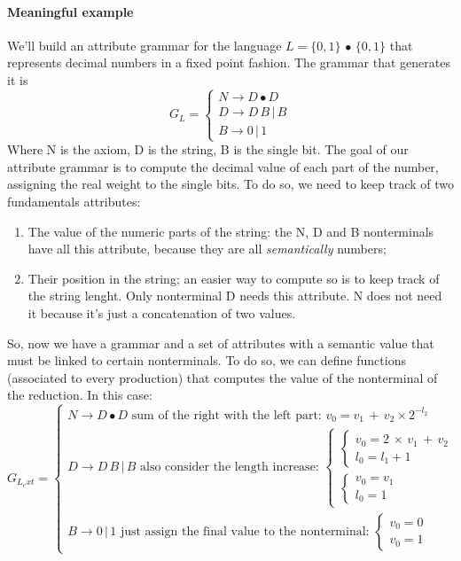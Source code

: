\documentclass[10pt,a4paper]{article}
\begin{document}
				\paragraph{Meaningful example}
					We'll build an attribute grammar for the language $L = \{0, 1\} \,\bullet\, \{0, 1\}$ that represents decimal numbers in a fixed point fashion. The grammar that generates it is
					\begin{equation}
						G_L = 
						\begin{cases}
							N \rightarrow D \bullet D \\
							D \rightarrow D \, B \, \vert \, B \\
							B \rightarrow 0 \, \vert \, 1
						\end{cases}
					\end{equation}
					Where N is the axiom, D is the string, B is the single bit. The goal of our attribute grammar is to compute the decimal value of each part of the number, assigning the real weight to the single bits. To do so, we need to keep track of two fundamentals attributes:
					\begin{enumerate}
						\item The value of the numeric parts of the string: the N, D and B nonterminals have all this attribute, because they are all \emph{semantically} numbers;
						\item Their position in the string; an easier way to compute so is to keep track of the string lenght. Only nonterminal D needs this attribute. N does not need it because it's just a concatenation of two values. 
					\end{enumerate}
					So, now we have a grammar and a set of attributes with a semantic value that must be linked to certain nonterminals. To do so, we can define functions (associated to every production) that computes the value of the nonterminal of the reduction. In this case:
					\begin{equation}
						G_{L_ext} = 
						\begin{cases}
							N \rightarrow D \bullet D \text{ sum of the right with the left part: } v_0 = v_1\,+\,v_2\times 2^{-l_2} \\
							D \rightarrow D \, B \, \vert \, B \text{ also consider the length increase: } 
								\begin{cases}
									\begin{cases}
										v_0 = 2 \,\times\, v_1\,+\,v_2 \\
										l_0 = l_1 + 1
									\end{cases}\\
									\begin{cases}
										v_0 = v_1 \\
										l_0 = 1
									\end{cases}
								\end{cases}\\
							B \rightarrow 0 \, \vert \, 1 \text{ just assign the final value to the nonterminal: } 
								\begin{cases}
									v_0 = 0\\
									v_0 = 1
								\end{cases}
						\end{cases}
					\end{equation}
\end{document}
